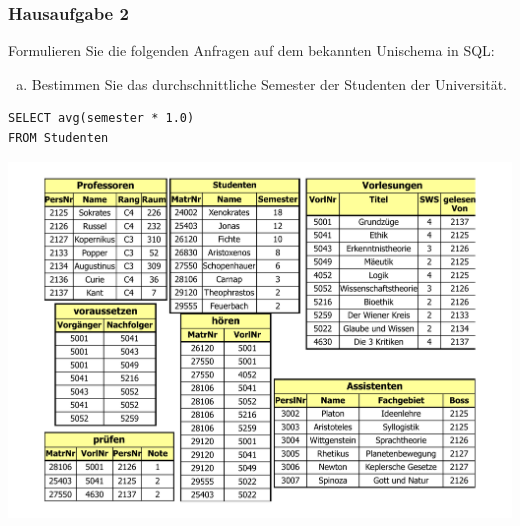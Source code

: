 \begin{frame}[fragile]
	\frametitle{Hausaufgabe 2}
	\vspace{0.5cm}

	\begin{multicols}{2}
		Formulieren Sie die folgenden Anfragen auf dem bekannten Unischema in SQL:
		\begin{enumerate}[a)]
			\item Bestimmen Sie das durchschnittliche Semester der Studenten der Universität.
		\end{enumerate}
		\begin{verbatim}
SELECT avg(semester * 1.0) 
FROM Studenten
		\end{verbatim}
		\vfill\columnbreak

		\begin{center}
			\includegraphics[height=.6\paperheight]{../img/uni.pdf}
		\end{center}
	\end{multicols}
\end{frame}

